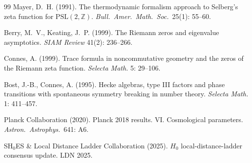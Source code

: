 \documentclass[11pt,a4paper]{article}
\theoremstyle{plain}
\theoremstyle{definition}
\begin{document}
\begin{thebibliography}{99}
Mayer, D.~H. (1991). The thermodynamic formalism approach to
Selberg's zeta function for $\mathrm{PSL}(2, \mathbb{Z})$.
\emph{Bull.\ Amer.\ Math.\ Soc.}\ 25(1): 55--60.

Berry, M.~V., Keating, J.~P. (1999). The Riemann zeros and eigenvalue
asymptotics. \emph{SIAM Review} 41(2): 236--266.

Connes, A. (1999). Trace formula in noncommutative geometry and the
zeros of the Riemann zeta function. \emph{Selecta Math.} 5: 29--106.

Bost, J.-B., Connes, A. (1995). Hecke algebras, type III factors and
phase transitions with spontaneous symmetry breaking in number
theory. \emph{Selecta Math.} 1: 411--457.

Planck Collaboration (2020). Planck 2018 results. VI. Cosmological
parameters. \emph{Astron.\ Astrophys.}\ 641: A6.

SH$_{0}$ES \& Local Distance Ladder Collaboration (2025). $H_{0}$
local-distance-ladder consensus update. LDN 2025.

\end{thebibliography}
\end{document}
